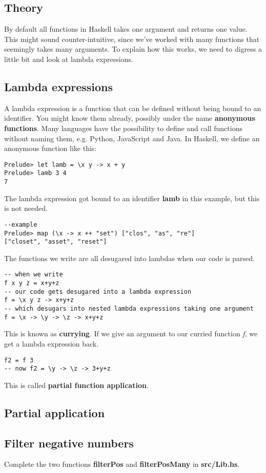 \documentclass{article}
\begin{document}
\subsection{Theory}
By default all functions in Haskell takes one argument and returns one value. This might sound counter-intuitive, since we've worked with many functions that seemingly takes many arguments. To explain how this works, we need to digress a little bit and look at lambda expressions.
\subsection{Lambda expressions}
A lambda expression is a function that can be defined without being bound to an identifier. You might know them already, possibly under the name \textbf{anonymous functions}. Many languages have the possibility to define and call functions without naming them, e.g. Python, JavaScript and Java. In Haskell, we define an anonymous function like this:
\lstset{language=Haskell}
\begin{lstlisting}
Prelude> let lamb = \x y -> x + y
Prelude> lamb 3 4
7
\end{lstlisting}
The lambda expression got bound to an identifier \textbf{lamb} in this example, but this is not needed.
\lstset{language=Haskell}
\begin{lstlisting}
--example
Prelude> map (\x -> x ++ "set") ["clos", "as", "re"]
["closet", "asset", "reset"]
\end{lstlisting}
The functions we write are all desugared into lambdas when our code is parsed.
\begin{lstlisting}
-- when we write
f x y z = x+y+z
-- our code gets desugared into a lambda expression
f = \x y z -> x+y+z
-- which desugars into nested lambda expressions taking one argument
f = \x -> \y -> \z -> x+y+z
\end{lstlisting}
This is known as \textbf{currying}. If we give an argument to our curried function \textit{f}, we get a lambda expression back.
\begin{lstlisting}
f2 = f 3
-- now f2 = \y -> \z -> 3+y+z
\end{lstlisting}
This is called \textbf{partial function application}.
\subsection{Partial application}
\subsection{Filter negative numbers}
Complete the two functions \textbf{filterPos} and \textbf{filterPosMany} in \textbf{src/Lib.hs}.
\end{document}
